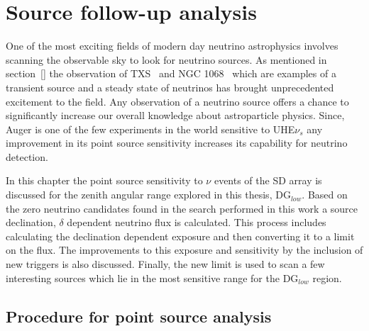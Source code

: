 
\chapter{Source follow-up analysis}
\label{chap:follow-up}

One of the most exciting fields of modern day neutrino astrophysics involves scanning the observable sky to look for neutrino sources. As mentioned in section~\ref{} the observation of TXS~\cite{} and NGC 1068~\cite{} which are examples of a transient source and a steady state of neutrinos has brought unprecedented excitement to the field. Any observation of a neutrino source offers a chance to significantly increase our overall knowledge about astroparticle physics. Since, Auger is one of the few experiments in the world sensitive to UHE$\nu_s$ any improvement in its point source sensitivity increases its capability for neutrino detection. 

In this chapter the point source sensitivity to $\nu$ events of the SD array is discussed for the zenith angular range explored in this thesis, DG$_{low}$. Based on the zero neutrino candidates found in the search performed in this work a source declination, $\delta$ dependent neutrino flux is calculated. This process includes calculating the declination dependent exposure and then converting it to a limit on the flux. The improvements to this exposure and sensitivity by the inclusion of new triggers is also discussed. Finally, the new limit is used to scan a few interesting sources which lie in the most sensitive range for the DG$_{low}$ region.

\section{Procedure for point source analysis}
\label{sec:procedure_point_source}


